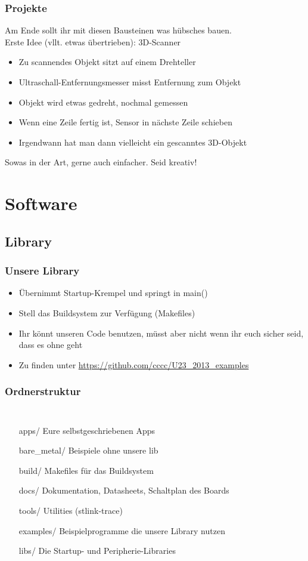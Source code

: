 \documentclass[ngerman,compress]{beamer}
\begin{document}
\begin{frame}
	\frametitle{Projekte}
	Am Ende sollt ihr mit diesen Bausteinen was hübsches bauen. \\
	Erste Idee (vllt. etwas übertrieben): 3D-Scanner
	\begin{itemize}
		\item Zu scannendes Objekt sitzt auf einem Drehteller
		\item Ultraschall-Entfernungsmesser misst Entfernung zum Objekt
		\item Objekt wird etwas gedreht, nochmal gemessen
		\item Wenn eine Zeile fertig ist, Sensor in nächste Zeile schieben
		\item Irgendwann hat man dann vielleicht ein gescanntes 3D-Objekt
	\end{itemize}
	Sowas in der Art, gerne auch einfacher. Seid kreativ!
\end{frame}

\section{Software}

\subsection{Library}

\begin{frame}
	\frametitle{Unsere Library}
	\begin{itemize}
		\item Übernimmt Startup-Krempel und springt in main()
		\item Stell das Buildsystem zur Verfügung (Makefiles)
		\item Ihr könnt unseren Code benutzen, müsst aber nicht wenn ihr euch sicher seid, dass es ohne geht
		\item Zu finden unter \url{https://github.com/cccc/U23_2013_examples}
	\end{itemize}
\end{frame}

\begin{frame}
	\frametitle{Ordnerstruktur}
	\begin{columns}
			\column{3in}
	\begin{itemize}
		\item[apps/] Eure selbstgeschriebenen Apps
		\item[bare\_metal/] Beispiele ohne unsere lib
		\item[build/] Makefiles für das Buildsystem
		\item[docs/] Dokumentation, Datasheets, Schaltplan des Boards
		\item[tools/] Utilities (stlink-trace)
		\item[examples/] Beispielprogramme die unsere Library nutzen
		\item[libs/] Die Startup- und Peripherie-Libraries
	\end{itemize}
	\end{columns}
\end{frame}
\end{document}

